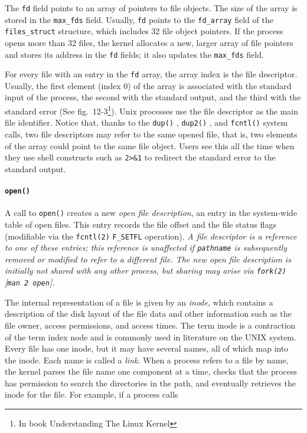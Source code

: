 The \texttt{fd} field points to an array of pointers to file objects. The size of the
array is stored in the \texttt{max\_fds} field. Usually, \texttt{fd} points to the
\texttt{fd\_array} field of the \texttt{files\_struct} structure, which includes 32 file
object pointers. If the process opens more than 32 files, the kernel allocates a new,
larger array of file pointers and stores its address in the \texttt{fd} fields; it also
updates the \texttt{max\_fds} field.

For every file with an entry in the \texttt{fd} array, the array index is the file
descriptor. Usually, the first element (index 0) of the array is associated with the
standard input of the process, the second with the standard output, and the third with the
standard error (See fig.~12-3\footnote{In book Understanding The Linux Kernel}). Unix
processes use the file descriptor as the main file identifier. Notice that, thanks to the
\verb|dup()| , \verb|dup2()| , and \verb|fcntl()| system calls, two file descriptors may
refer to the same opened file, that is, two elements of the array could point to the same
file object. Users see this all the time when they use shell constructs such as
\texttt{2>\&1} to redirect the standard error to the standard output.

\paragraph{\texttt{open()}}

A call to \verb|open()| creates a new \emph{open file description}, an entry in the
system-wide table of open files.  This entry records the file offset and the file status
flags (modifiable via the \texttt{fcntl(2)} \verb|F_SETFL| operation). \emph{A file
  descriptor is a reference to one of these entries; this reference is unaffected if
  \texttt{pathname} is subsequently removed or modified to refer to a different file.  The
  new \emph{open file description} is initially not shared with any other process, but
  sharing may arise via \texttt{fork(2)} [\texttt{man 2 open}].}
  
The internal representation of a file is given by an \emph{inode}, which contains a
description of the disk layout of the file data and other information such as the file
owner, access permissions, and access times. The term inode is a contraction of the term
index node and is commonly used in literature on the UNIX system. Every file has one
inode, but it may have several names, all of which map into the inode. Each name is called
a \emph{link}.  When a process refers to a file by name, the kernel parses the file name
one component at a time, checks that the process has permission to search the directories
in the path, and eventually retrieves the inode for the file. For example, if a process
calls

